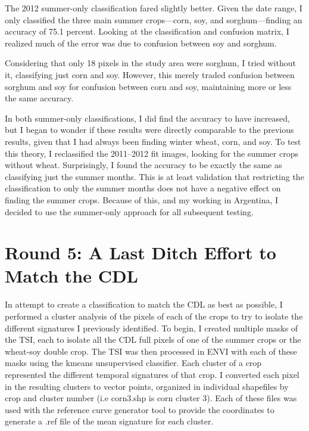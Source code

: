 The 2012 summer-only classification fared slightly better. Given the date range, I only classified the three main summer crops---corn, soy, and sorghum---finding an accuracy of 75.1 percent. Looking at the classification and confusion matrix, I realized much of the error was due to confusion between soy and sorghum. %

Considering that only 18 pixels in the study area were sorghum, I tried without it, classifying just corn and soy. However, this merely traded confusion between sorghum and soy for confusion between corn and soy, maintaining more or less the same accuracy. %

In both summer-only classifications, I did find the accuracy to have increased, but I began to wonder if these results were directly comparable to the previous results, given that I had always been finding winter wheat, corn, and soy. To test this theory, I reclassified the 2011--2012 fit images, looking for the summer crops without wheat. Surprisingly, I found the accuracy to be exactly the same as classifying just the summer months. %
This is at least validation that restricting the classification to only the summer months does not have a negative effect on finding the summer crops. Because of this, and my working in Argentina, I decided to use the summer-only approach for all subsequent testing.

\section{Round 5: A Last Ditch Effort to Match the CDL}

In attempt to create a classification to match the CDL as best as possible, I performed a cluster analysis of the pixels of each of the crops to try to isolate the different signatures I previously identified. To begin, I created multiple masks of the TSI, each to isolate all the CDL full pixels of one of the summer crops or the wheat-soy double crop. The TSI was then processed in ENVI with each of these masks using the kmeans unsupervised classifier. Each cluster of a crop represented the different temporal signatures of that crop. I converted each pixel in the resulting clusters to vector points, organized in individual shapefiles by crop and cluster number (i.e corn3.shp is corn cluster 3). Each of these files was used with the reference curve generator tool to provide the coordinates to generate a .ref file of the mean signature for each cluster.

